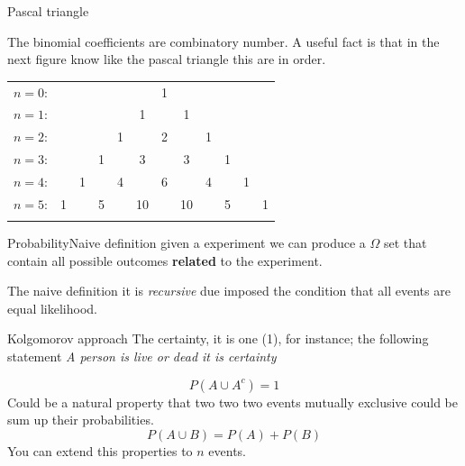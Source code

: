 \documentclass{beamer}
\begin{document}
\begin{frame}{Pascal triangle}

 The binomial coefficients are combinatory number.  A useful fact is that  in the next figure know like the pascal triangle this are in order. 

\begin{center}

\begin{tabular}{rccccccccccc}
$n=0$:&    &    &    &    &  & 1\\\noalign{\smallskip\smallskip}
$n=1$:&    &    &    &   &   1  &  & 1\\\noalign{\smallskip\smallskip}
$n=2$:&    &    &   & 1   &   & 2   &  & 1\\\noalign{\smallskip\smallskip}
$n=3$:&    &   &  1  &   & 3   &   &  3  &  &1\\\noalign{\smallskip\smallskip}
$n=4$:&   &  1  &   & 4   &   & 6   &   & 4   & &   1 \\\noalign{\smallskip\smallskip}
$n=5$:&  1 &    &  5 &    & 10 &    &  10 &    &  5 & & 1\\ \noalign{\smallskip\smallskip}

\end{tabular}
\end{center}
\end{frame}


\begin{frame}{Probability}{Naive definition}
given a experiment we can produce a $\Omega$ set that contain all possible outcomes \textbf{related} to the experiment.

The naive definition it is \textit{recursive} due imposed the condition that all events are equal likelihood. 

\end{frame}



\begin{frame}{Kolgomorov approach}
The certainty, it is one (1),  for instance; the following statement \emph{A person is live or dead it is certainty }

\begin{equation}
P(A \cup A^{c}) = 1
\end{equation}
Could be a natural property that two two two events mutually exclusive could be sum up their probabilities.
\begin{equation}
P(A \cup B) = P(A) + P(B)
\end{equation}
You can extend this properties to $n$ events.
\end{frame}
\end{document}
